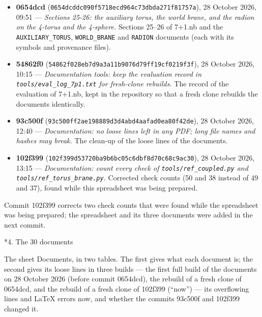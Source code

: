 \documentclass[10pt,a4paper]{article}
\makeatletter
\renewcommand\section{\@startsection{section}{1}{\z@}{-3.5ex \@plus -1ex \@minus -.2ex}{2.3ex \@plus.2ex}{\normalfont\Large\bfseries\raggedright}}
\makeatother
\begin{document}
\begin{itemize}
\item \textbf{0654dcd} (\texttt{0654dcdd\allowbreak{}c090f571\allowbreak{}8ecd964c\allowbreak{}73dbda27\allowbreak{}1f81757a}), 28 October 2026, 09:51 — \emph{Sections 25-26: the auxiliary torus, the world brane, and the radion on the 4-torus and the 4-sphere.} Sections 25–26 of 7+1.nb and the \texttt{AUXILIARY\_\allowbreak{}TORUS}, \texttt{WORLD\_\allowbreak{}BRANE} and \texttt{RADION} documents (each with its symbols and provenance files).
\item \textbf{54862f0} (\texttt{54862f02\allowbreak{}8eb7d9a3\allowbreak{}a11b9076\allowbreak{}d79ff19c\allowbreak{}f0219f3f}), 28 October 2026, 10:15 — \emph{Documentation tools: keep the evaluation record in \texttt{tools/\allowbreak{}eval\_\allowbreak{}log\_\allowbreak{}7p1.txt} for fresh-clone rebuilds.} The record of the evaluation of 7+1.nb, kept in the repository so that a fresh clone rebuilds the documents identically.
\item \textbf{93c500f} (\texttt{93c500ff\allowbreak{}2ae19888\allowbreak{}9d3d4abd\allowbreak{}4aafad0e\allowbreak{}a80f42de}), 28 October 2026, 12:40 — \emph{Documentation: no loose lines left in any PDF; long file names and hashes may break.} The clean-up of the loose lines of the documents.
\item \textbf{102f399} (\texttt{102f399d\allowbreak{}53720ba9\allowbreak{}b6bc05c6\allowbreak{}dbf8d70c\allowbreak{}68c9ac30}), 28 October 2026, 13:15 — \emph{Documentation: count every check of \texttt{tools/\allowbreak{}ref\_\allowbreak{}coupled.py} and \texttt{tools/\allowbreak{}ref\_\allowbreak{}torus\_\allowbreak{}brane.py}.} Corrected check counts (50 and 38 instead of 49 and 37), found while this spreadsheet was being prepared.
\end{itemize}
Commit 102f399 corrects two check counts that were found while the spreadsheet was being prepared; the spreadsheet and its three documents were added in the next commit.

\section*{4. The 30 documents}
The sheet Documents, in two tables. The first gives what each document is; the second gives its loose lines in three builds — the first full build of the documents on 28 October 2026 (before commit 0654dcd), the rebuild of a fresh clone of 0654dcd, and the rebuild of a fresh clone of 102f399 (“now”) — its overflowing lines and LaTeX errors now, and whether the commits 93c500f and 102f399 changed it.
\end{document}
